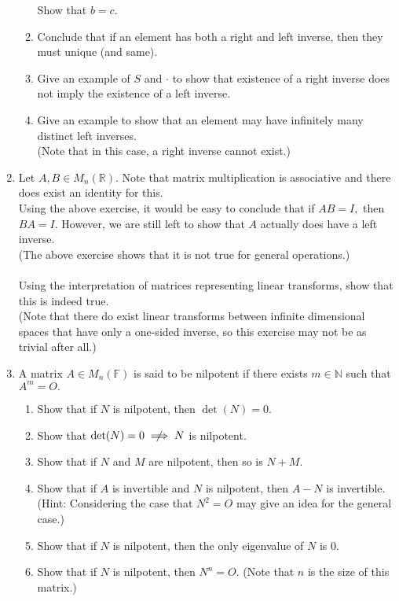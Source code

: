 \documentclass{article}
\begin{document}
\begin{enumerate}
\begin{enumerate}[nosep]
		Show that $b = c.$
		\item Conclude that if an element has both a right and left inverse, then they must unique (and same).
		\item Give an example of $S$ and $\cdot$ to show that existence of a right inverse does not imply the existence of a left inverse.
		\item Give an example to show that an element may have infinitely many distinct left inverses.\\
		(Note that in this case, a right inverse cannot exist.)
	\end{enumerate}
	\item Let $A, B \in M_n(\mathbb{R}).$ Note that matrix multiplication is associative and there does exist an identity for this. \\
	Using the above exercise, it would be easy to conclude that if $AB = I,$ then $BA = I.$ However, we are still left to show that $A$ actually does have a left inverse.\\
	(The above exercise shows that it is not true for general operations.)\\~\\
	Using the interpretation of matrices representing linear transforms, show that this is indeed true.\\
	(Note that there do exist linear transforms between infinite dimensional spaces that have only a one-sided inverse, so this exercise may not be as trivial after all.)
	\item A matrix $A \in M_n(\mathbb{F})$ is said to be nilpotent if there exists $m \in \mathbb{N}$ such that $A^m = O.$
	\begin{enumerate} 
		\item Show that if $N$ is nilpotent, then $\det(N) = 0.$
		\item Show that $\det(N) = 0 \centernot\implies N$ is nilpotent.
		\item Show that if $N$ and $M$ are nilpotent, then so is $N+M.$
		\item Show that if $A$ is invertible and $N$ is nilpotent, then $A - N$ is invertible.\\
		(Hint: Considering the case that $N^2 = O$ may give an idea for the general case.)
		\item Show that if $N$ is nilpotent, then the only eigenvalue of $N$ is $0.$
		\item Show that if $N$ is nilpotent, then $N^n = O.$ (Note that $n$ is the size of this matrix.)
	\end{enumerate}

\end{enumerate}
\end{document}
